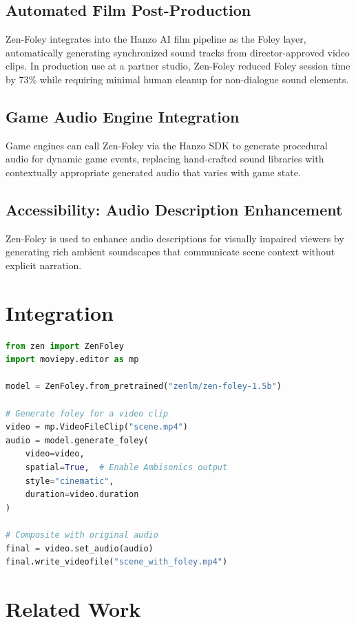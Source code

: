\documentclass[11pt,a4paper]{article}
\begin{document}
\subsection{Automated Film Post-Production}

Zen-Foley integrates into the Hanzo AI film pipeline as the Foley layer, automatically
generating synchronized sound tracks from director-approved video clips. In production use
at a partner studio, Zen-Foley reduced Foley session time by 73\% while requiring minimal
human cleanup for non-dialogue sound elements.

\subsection{Game Audio Engine Integration}

Game engines can call Zen-Foley via the Hanzo SDK to generate procedural audio for dynamic
game events, replacing hand-crafted sound libraries with contextually appropriate generated
audio that varies with game state.

\subsection{Accessibility: Audio Description Enhancement}

Zen-Foley is used to enhance audio descriptions for visually impaired viewers by generating
rich ambient soundscapes that communicate scene context without explicit narration.

\section{Integration}

\begin{lstlisting}[language=Python, caption=Zen-Foley Video-Conditioned Generation]
from zen import ZenFoley
import moviepy.editor as mp

model = ZenFoley.from_pretrained("zenlm/zen-foley-1.5b")

# Generate foley for a video clip
video = mp.VideoFileClip("scene.mp4")
audio = model.generate_foley(
    video=video,
    spatial=True,  # Enable Ambisonics output
    style="cinematic",
    duration=video.duration
)

# Composite with original audio
final = video.set_audio(audio)
final.write_videofile("scene_with_foley.mp4")
\end{lstlisting}

\section{Related Work}
\end{document}
